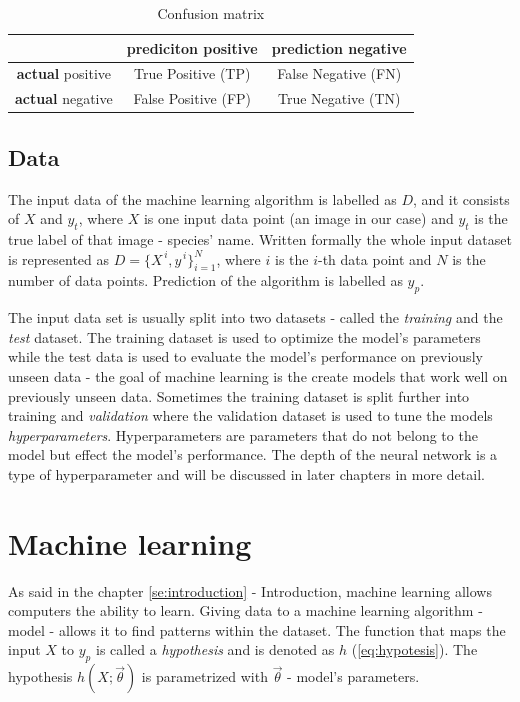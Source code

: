 \documentclass[times, utf8, diplomski]{fer}
\begin{document}
\begin{table}
\centering
\caption{Confusion matrix}
\label{tb:confusion_matrix}
\begin{tabular}{|c|c|c|}
\hline 
 & \textbf{prediciton} positive & \textbf{prediction} negative \\ 
\hline 
\textbf{actual} positive & True Positive (TP) & False Negative (FN) \\ 
\hline 
\textbf{actual} negative & False Positive (FP) & True Negative (TN) \\ 
\hline 
\end{tabular}
\end{table}

\subsection{Data} \label{se:data}
The input data of the machine learning algorithm is labelled as $D$, and it consists of $X$ and $y_{t}$, where $X$ is one input data point (an image in our case) and $y_{t}$ is the true label of that image - species' name. Written formally the whole input dataset is represented as $D = \{{X}^{\,i},y^{\,i}\}^{N}_{i=1}$, where $i$ is the $i$-th data point and $N$ is the number of data points. Prediction of the algorithm is labelled as $y_{p}$.

The input data set is usually split into two datasets - called the \textit{training} and the \textit{test} dataset. The training dataset is used to optimize the model's parameters while the test data is used to evaluate the model's performance on previously unseen data - the goal of machine learning is the create models that work well on previously unseen data. Sometimes the training dataset is split further into training and \textit{validation} where the validation dataset is used to tune the models \textit{hyperparameters}. Hyperparameters are parameters that do not belong to the model but  effect the model's performance. The depth of the neural network is a type of hyperparameter and will be discussed in later chapters in more detail.


\section{Machine learning}
\label{se:machine_learning}

As said in the chapter \ref{se:introduction} - Introduction, machine learning allows computers the ability to learn. Giving data to a machine learning algorithm - model - allows it to find patterns within the dataset. The function that maps the input $X$ to $y_p$ is called a \textit{hypothesis} and is denoted as $h$ (\ref{eq:hypotesis}). The hypothesis $h(X ; \vec{\theta})$ is parametrized with $\vec{\theta}$ - model's parameters.
\end{document}
